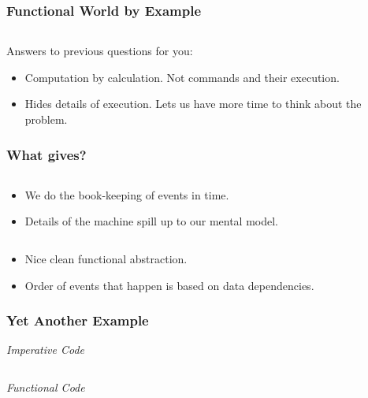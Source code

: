 \documentclass{beamer}
\begin{document}
\begin{frame}[fragile,t]
  \frametitle{Functional World by Example}

  \inputminted[frame=lines,fontsize=\footnotesize,linenos=true]{haskell}{code/slides/SumFive.hs}

  Answers to previous questions for you:
  \begin{itemize}
  \item Computation by calculation. Not commands and their execution.
  \item Hides details of execution. Lets us have more time to think about the problem.
  \end{itemize}

\end{frame}

\begin{frame}[fragile,t]
  \frametitle{What gives?}

  \begin{multicols}{2}

    \inputminted[frame=lines,fontsize=\tiny]{c}{code/slides/sumfive.c}

    \begin{itemize}
    \item We do the book-keeping of events in time.
    \item Details of the machine spill up to our mental model.
    \end{itemize}

    \columnbreak

    \inputminted[frame=lines,fontsize=\tiny]{haskell}{code/slides/SumFiveShort.hs}

    \begin{itemize}
    \item Nice clean functional abstraction.
    \item Order of events that happen is based on data dependencies.
    \end{itemize}

  \end{multicols}

\end{frame}

\begin{frame}[fragile,t]
  \frametitle{Yet Another Example}

  \emph{Imperative Code}
  \inputminted[frame=lines,fontsize=\footnotesize]{c}{code/slides/primes.c}

  \vfill

  \emph{Functional Code}
  \inputminted[frame=lines,fontsize=\footnotesize]{haskell}{code/slides/Primes.hs}

\end{frame}
\end{document}
